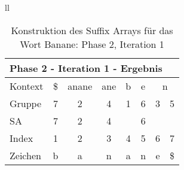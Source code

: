 \begin{table}[H]
\begin{adjustbox}{max width=\textwidth}
\begin{tabular}{ll}
\begin{tabular}{lccccccc}
\multicolumn{8}{l}{Phase 2 - Iteration 1 - Ergebnis}                                                                                                                                                                                       \\ \hline
\multicolumn{1}{l|}{Kontext} & \multicolumn{1}{c|}{\$} & \multicolumn{1}{c|}{anane}                     & \multicolumn{1}{c|}{ane}                       & \multicolumn{1}{c|}{b} & \multicolumn{1}{c|}{e}                         & \multicolumn{2}{c}{n}   \\
\multicolumn{1}{l|}{Gruppe}  & \multicolumn{1}{c|}{7}  & \multicolumn{1}{c|}{2}                         & \multicolumn{1}{c|}{4}                         & \multicolumn{1}{c|}{1} & \multicolumn{1}{c|}{6}                         & 3 & 5  \\ 
\multicolumn{1}{l|}{SA}      & \multicolumn{1}{c|}{7}  & \multicolumn{1}{c|}{\cellcolor[HTML]{\yellow}2} & \multicolumn{1}{c|}{\cellcolor[HTML]{\yellow}4} & \multicolumn{1}{c|}{}  & \multicolumn{1}{c|}{\cellcolor[HTML]{\yellow}6} &   &    \\ \hline
\multicolumn{1}{l|}{Index}   & 1                       & 2                                              & 3                                              & 4                      & 5                                              & 6 & 7  \\
\multicolumn{1}{l|}{Zeichen} & b                       & a                                              & n                                              & a                      & n                                              & e & \$
\end{tabular}

\end{tabular}
\end{adjustbox}

\caption[Konstruktion des Suffix Arrays f{\"u}r das Wort Banane: Phase 2, Iteration 1]{Konstruktion des Suffix Arrays f{\"u}r das Wort Banane: Phase 2, Iteration 1}
\label{fig_banane_2_1} 
\end{table}
